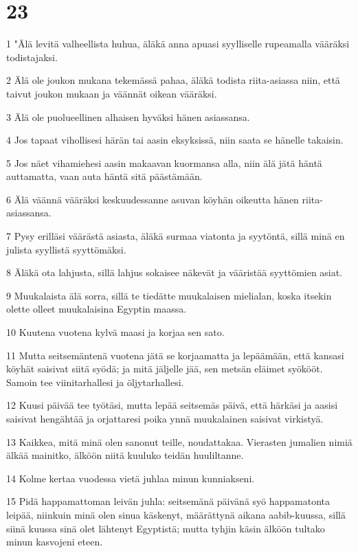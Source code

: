 \chapter{23}

\par 1 "Älä levitä valheellista huhua, äläkä anna apuasi syylliselle rupeamalla vääräksi todistajaksi.
\par 2 Älä ole joukon mukana tekemässä pahaa, äläkä todista riita-asiassa niin, että taivut joukon mukaan ja väännät oikean vääräksi.
\par 3 Älä ole puolueellinen alhaisen hyväksi hänen asiassansa.
\par 4 Jos tapaat vihollisesi härän tai aasin eksyksissä, niin saata se hänelle takaisin.
\par 5 Jos näet vihamiehesi aasin makaavan kuormansa alla, niin älä jätä häntä auttamatta, vaan auta häntä sitä päästämään.
\par 6 Älä väännä vääräksi keskuudessanne asuvan köyhän oikeutta hänen riita-asiassansa.
\par 7 Pysy erilläsi väärästä asiasta, äläkä surmaa viatonta ja syytöntä, sillä minä en julista syyllistä syyttömäksi.
\par 8 Äläkä ota lahjusta, sillä lahjus sokaisee näkevät ja vääristää syyttömien asiat.
\par 9 Muukalaista älä sorra, sillä te tiedätte muukalaisen mielialan, koska itsekin olette olleet muukalaisina Egyptin maassa.
\par 10 Kuutena vuotena kylvä maasi ja korjaa sen sato.
\par 11 Mutta seitsemäntenä vuotena jätä se korjaamatta ja lepäämään, että kansasi köyhät saisivat siitä syödä; ja mitä jäljelle jää, sen metsän eläimet syökööt. Samoin tee viinitarhallesi ja öljytarhallesi.
\par 12 Kuusi päivää tee työtäsi, mutta lepää seitsemäs päivä, että härkäsi ja aasisi saisivat hengähtää ja orjattaresi poika ynnä muukalainen saisivat virkistyä.
\par 13 Kaikkea, mitä minä olen sanonut teille, noudattakaa. Vierasten jumalien nimiä älkää mainitko, älköön niitä kuuluko teidän huuliltanne.
\par 14 Kolme kertaa vuodessa vietä juhlaa minun kunniakseni.
\par 15 Pidä happamattoman leivän juhla: seitsemänä päivänä syö happamatonta leipää, niinkuin minä olen sinua käskenyt, määrättynä aikana aabib-kuussa, sillä siinä kuussa sinä olet lähtenyt Egyptistä; mutta tyhjin käsin älköön tultako minun kasvojeni eteen.
